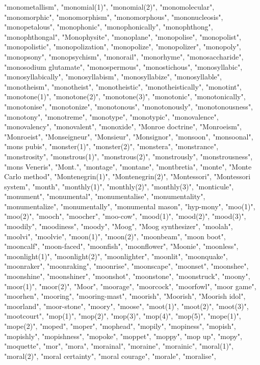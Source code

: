 "monometallism",
"monomial(1)",
"monomial(2)",
"monomolecular",
"monomorphic",
"monomorphism",
"monomorphous",
"mononucleosis",
"monopetalous",
"monophonic",
"monophonically",
"monophthong",
"monophthongal",
"Monophysite",
"monoplane",
"monopolise",
"monopolist",
"monopolistic",
"monopolization",
"monopolize",
"monopolizer",
"monopoly",
"monopsony",
"monopsychism",
"monorail",
"monorhyme",
"monosaccharide",
"monosodium glutamate",
"monospermous",
"monostichous",
"monosyllabic",
"monosyllabically",
"monosyllabism",
"monosyllabize",
"monosyllable",
"monotheism",
"monotheist",
"monotheistic",
"monotheistically",
"monotint",
"monotone(1)",
"monotone(2)",
"monotone(3)",
"monotonic",
"monotonically",
"monotonise",
"monotonize",
"monotonous",
"monotonously",
"monotonousness",
"monotony",
"monotreme",
"monotype",
"monotypic",
"monovalence",
"monovalency",
"monovalent",
"monoxide",
"Monroe doctrine",
"Monroeism",
"Monroeist",
"Monseigneur",
"Monsieur",
"Monsignor",
"monsoon",
"monsoonal",
"mons pubis",
"monster(1)",
"monster(2)",
"monstera",
"monstrance",
"monstrosity",
"monstrous(1)",
"monstrous(2)",
"monstrously",
"monstrousness",
"mons Veneris",
"Mont.",
"montage",
"montane",
"montbretia",
"monte",
"Monte Carlo method",
"Montenegrin(1)",
"Montenegrin(2)",
"Montessori",
"Montessori system",
"month",
"monthly(1)",
"monthly(2)",
"monthly(3)",
"monticule",
"monument",
"monumental",
"monumentalise",
"monumentality",
"monumentalize",
"monumentally",
"monumental mason",
"hyp-mony",
"moo(1)",
"moo(2)",
"mooch",
"moocher",
"moo-cow",
"mood(1)",
"mood(2)",
"mood(3)",
"moodily",
"moodiness",
"moody",
"Moog",
"Moog synthesizer",
"moolah",
"moolvi",
"moolvie",
"moon(1)",
"moon(2)",
"moonbeam",
"moon boot",
"mooncalf",
"moon-faced",
"moonfish",
"moonflower",
"Moonie",
"moonless",
"moonlight(1)",
"moonlight(2)",
"moonlighter",
"moonlit",
"moonquake",
"moonraker",
"moonraking",
"moonrise",
"moonscape",
"moonset",
"moonshee",
"moonshine",
"moonshiner",
"moonshot",
"moonstone",
"moonstruck",
"moony",
"moor(1)",
"moor(2)",
"Moor",
"moorage",
"moorcock",
"moorfowl",
"moor game",
"moorhen",
"mooring",
"mooring-mast",
"moorish",
"Moorish",
"Moorish idol",
"moorland",
"moor-stone",
"moory",
"moose",
"moot(1)",
"moot(2)",
"moot(3)",
"mootcourt",
"mop(1)",
"mop(2)",
"mop(3)",
"mop(4)",
"mop(5)",
"mope(1)",
"mope(2)",
"moped",
"moper",
"mophead",
"mopily",
"mopiness",
"mopish",
"mopishly",
"mopishness",
"mopoke",
"moppet",
"moppy",
"mop up",
"mopy",
"moquette",
"mor",
"mora",
"morainal",
"moraine",
"morainic",
"moral(1)",
"moral(2)",
"moral certainty",
"moral courage",
"morale",
"moralise",
